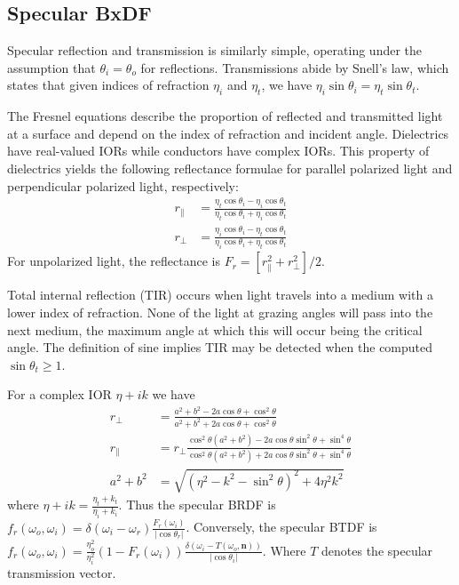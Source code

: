 \documentclass{article}
\begin{document}
  \subsection{Specular BxDF}
  Specular reflection and transmission is similarly simple,
  operating under the assumption that 
  $\theta_i = \theta_o$ for reflections.
  Transmissions abide by 
  Snell's law, 
  which states that given 
  indices of refraction $\eta_i$ and $\eta_t$,
  we have $\eta_i\sin\theta_i = \eta_t\sin\theta_t$.

  The Fresnel equations describe the proportion of 
  reflected and transmitted light at a surface and 
  depend on the index of refraction and 
  incident angle. 
  Dielectrics have real-valued IORs while 
  conductors have complex IORs.
  This property of dielectrics yields 
  the following reflectance 
  formulae for 
  parallel polarized light and 
  perpendicular polarized light, respectively:
  \begin{align*}
    r_{\|} &= \frac{\eta_t\cos\theta_i - \eta_i\cos\theta_t}{\eta_t\cos\theta_i + \eta_i\cos\theta_t}\\
    r_{\perp} &= \frac{\eta_i\cos\theta_i - \eta_t\cos\theta_t}{\eta_i\cos\theta_i + \eta_t\cos\theta_t}
  \end{align*}
  For unpolarized light, the reflectance is $F_r = \left[r_{\|}^2 + r_{\perp}^2\right]/2$.

  Total internal reflection (TIR) occurs when 
  light travels into a medium with a lower index of refraction.
  None of the light at grazing angles will pass into the next medium,
  the maximum angle at which this will occur being the critical angle.
  The definition of sine implies TIR may be detected 
  when the computed $\sin\theta_t \geq 1$.

  For a complex IOR $\eta + ik$ we have 
  \begin{align*}
    r_{\perp} &= \frac{a^2+b^2 - 2a\cos\theta + \cos^2\theta}{a^2+b^2 + 2a\cos\theta + \cos^2\theta}\\
    r_{\|} &= r_{\perp}\frac{\cos^2\theta(a^2+b^2)-2a\cos\theta\sin^2\theta + \sin^4\theta}{\cos^2\theta(a^2+b^2) +2a\cos\theta\sin^2\theta + \sin^4\theta}\\
    a^2 + b^2 &= \sqrt{(\eta^2 - k^2 - \sin^2\theta)^2 + 4\eta^2k^2}
  \end{align*}
  where $\eta+ik = \frac{\eta_t + k_t}{\eta_i + k_i}$.
  Thus the specular BRDF 
  is $f_r(\omega_o,\omega_i) = \delta(\omega_i-\omega_r)\frac{F_r(\omega_i)}{|\cos\theta_r|}$.
  Conversely,
  the specular BTDF is 
  $f_r(\omega_o,\omega_i) = \frac{\eta_o^2}{\eta_i^2}(1-F_r(\omega_i))
  \frac{\delta(\omega_i-T(\omega_o, \bm{n}))}{|\cos\theta_i|}$.
  Where $T$ denotes the specular transmission vector.
\end{document}
